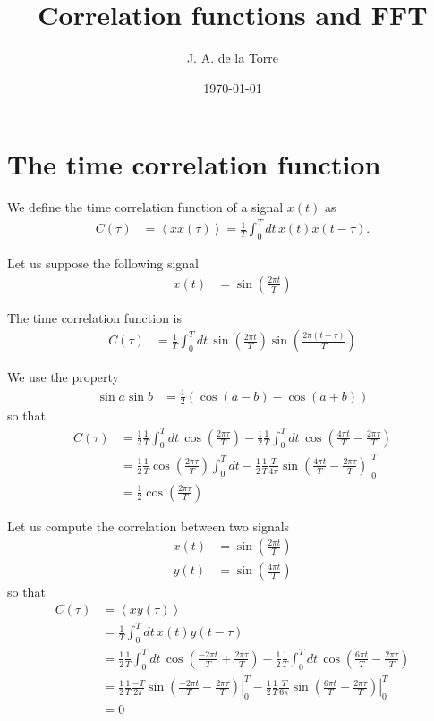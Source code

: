 \documentclass{article}
\title{Correlation functions and FFT}
\author{J. A. de la Torre}
\date{\today}
\begin{document}
\maketitle

\section{The time correlation function}
We define the time correlation function of a signal $x(t)$ as
\begin{align}
  C(\tau) &= \left< x x(\tau)\right> = \frac{1}{T}\int_0^{T} dt\, x(t) x(t-\tau).
\end{align}

Let us suppose the following signal
\begin{align}
  x(t)&= \sin \left( \frac{2 \pi t}{T} \right)
\end{align}

The time correlation function is
\begin{align}
  C(\tau) &= \frac{1}{T} \int_0^{T} dt\,\sin \left( \frac{2 \pi t}{T} \right)\sin \left( \frac{2 \pi (t-\tau)}{T} \right) 
\end{align}

We use the property
\begin{align}
  \sin a \sin b &= \frac{1}{2} \left( \cos(a-b) - \cos (a+b) \right)
\end{align}
so that
\begin{align}
  C(\tau) &= \frac{1}{2} \frac{1}{T} \int_0^T dt\, \cos \left(\frac{2 \pi \tau}{T} \right)
           - \frac{1}{2} \frac{1}{T} \int_0^T dt\, \cos \left(\frac{4 \pi t}{T} - \frac{2 \pi \tau}{T} \right) \\
           &=\frac{1}{2} \frac{1}{T} \cos \left(\frac{2\pi \tau}{T}\right)  \int_{0}^{T} dt
           - \frac{1}{2} \frac{1}{T} \left. \frac{T}{4\pi} \sin \left(\frac{4\pi t}{T} - \frac{2\pi \tau}{T}\right) \right|_{0}^{T} \\
           &= \frac{1}{2} \cos \left( \frac{2 \pi \tau}{T} \right)
\end{align}

Let us compute the correlation between two signals
\begin{align}
  x(t)&= \sin \left( \frac{2 \pi t}{T} \right) \\
  y(t)&= \sin \left( \frac{4 \pi t}{T} \right)
\end{align}
so that
\begin{align}
  C(\tau) &= \left< x y(\tau) \right> \\
          &= \frac{1}{T}\int_0^{T} dt\, x(t) y(t-\tau) \\
          &= \frac{1}{2} \frac{1}{T} \int_0^T dt\, \cos\left( \frac{-2\pi t}{T} + \frac{2 \pi \tau}{T} \right)
           - \frac{1}{2} \frac{1}{T} \int_0^T dt\, \cos\left( \frac{ 6\pi t}{T} - \frac{2 \pi \tau}{T} \right) \\
           &=\frac{1}{2} \frac{1}{T} \left. \frac{-T}{2\pi} \sin \left(  \frac{-2\pi t}{T}- \frac{2 \pi \tau}{T} \right) \right|_{0}^{T}
             - \frac{1}{2} \frac{1}{T} \left. \frac{T}{6\pi} \sin \left(  \frac{6\pi t}{T}- \frac{2 \pi \tau}{T} \right) \right|_{0}^{T} \\
           &= 0
\end{align}
\end{document}
